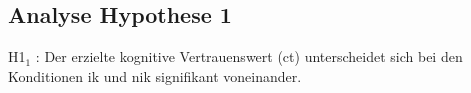 \documentclass[a4paper,11pt]{article}%
\renewcommand{\\}{\vspace*{0.5\baselineskip} \newline}
\begin{document}
%
%

\newpage
	
	\subsection{Analyse Hypothese 1}
H1$_{1}$ : Der erzielte kognitive Vertrauenswert (\ac{ct}) unterscheidet sich bei den Konditionen \ac{ik} und \ac{nik} signifikant voneinander.
\end{document}

